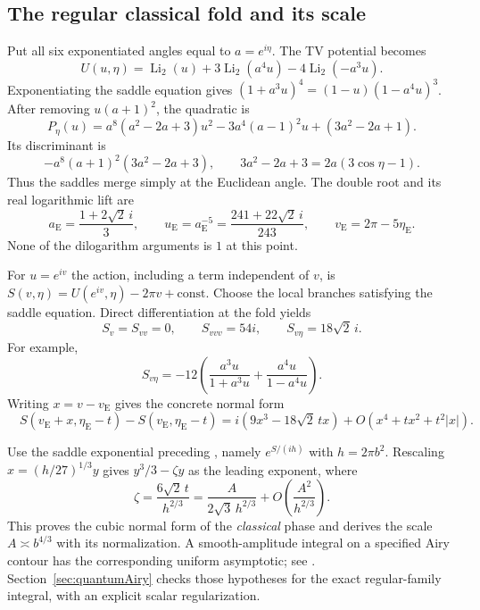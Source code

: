 \documentclass[11pt,a4paper]{article}
\numberwithin{equation}{section}
\theoremstyle{definition}
\theoremstyle{remark}
\begin{document}
\subsection{The regular classical fold and its scale}

Put all six exponentiated angles equal to $a=e^{i\eta}$.
The TV potential becomes
\[
 U(u,\eta)=\operatorname{Li}_2(u)
          +3\operatorname{Li}_2(a^4u)
          -4\operatorname{Li}_2(-a^3u).
\]
Exponentiating the saddle equation gives
$(1+a^3u)^4=(1-u)(1-a^4u)^3$. After removing
$u(a+1)^2$, the quadratic is
\begin{equation}
 P_\eta(u)=a^8(a^2-2a+3)u^2
              -3a^4(a-1)^2u+(3a^2-2a+1).
 \label{eq:regularsaddlequadratic}
\end{equation}
Its discriminant is
\[
 -a^8(a+1)^2(3a^2-2a+3),\qquad
 3a^2-2a+3=2a(3\cos\eta-1).
\]
Thus the saddles merge simply at the Euclidean angle.
The double root and its real logarithmic lift are
\[
 a_{\mathrm E}=\frac{1+2\sqrt2\,i}{3},\qquad
 u_{\mathrm E}=a_{\mathrm E}^{-5}
   =\frac{241+22\sqrt2\,i}{243},\qquad
 v_{\mathrm E}=2\pi-5\eta_{\mathrm E}.
\]
None of the dilogarithm arguments is $1$ at this point.

For $u=e^{iv}$ the action, including a term independent of
$v$, is $S(v,\eta)=U(e^{iv},\eta)-2\pi v+\text{const.}$
Choose the local branches satisfying the saddle equation.
Direct differentiation at the fold yields
\[
 S_v=S_{vv}=0,\qquad
 S_{vvv}=54i,\qquad S_{v\eta}=18\sqrt2\,i.
\]
For example,
\[
 S_{v\eta}=-12\left(\frac{a^3u}{1+a^3u}
                         +\frac{a^4u}{1-a^4u}\right).
\]
Writing $x=v-v_{\mathrm E}$ gives the concrete normal form
\begin{equation}
 \boxed{\quad
 S(v_{\mathrm E}+x,\eta_{\mathrm E}-t)
       -S(v_{\mathrm E},\eta_{\mathrm E}-t)
 =i(9x^3-18\sqrt2\,t x)
       +O(x^4+t x^2+t^2|x|).
 \quad}
 \label{eq:regularcubicfold}
\end{equation}

Use the saddle exponential preceding
\cite[eq.~(3.11)]{TeschnerVartanov}, namely $e^{S/(ih)}$
with $h=2\pi b^2$. Rescaling $x=(h/27)^{1/3}y$ gives
$y^3/3-\zeta y$ as the leading exponent, where
\begin{equation}
 \boxed{\quad
 \zeta=\frac{6\sqrt2\,t}{h^{2/3}}
       =\frac{A}{2\sqrt3\,h^{2/3}}
          +O\left(\frac{A^2}{h^{2/3}}\right).
 \quad}
 \label{eq:regularAiryvariable}
\end{equation}
This proves the cubic normal form of the \emph{classical}
phase and derives the scale $A\asymp b^{4/3}$ with its
normalization. A smooth-amplitude integral on a specified
Airy contour has the corresponding uniform asymptotic; see
\cite[Section~36.12]{DLMF}. Section~\ref{sec:quantumAiry}
checks those hypotheses for the exact regular-family integral,
with an explicit scalar regularization.
\end{document}
